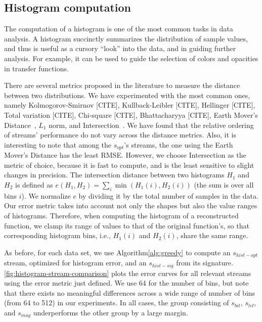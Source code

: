 \subsection{Histogram computation}\label{sec:histogram}


The computation of a histogram is one of the most common tasks in data analysis. A histogram
succinctly summarizes the distribution of sample values, and thus is useful as a cursory ``look''
into the data, and in guiding further analysis. For example, it can be used to guide the selection
of colors and opacities in transfer functions.

There are several metrics proposed in the literature to measure the distance between two
distributions. We have experimented with the most common ones, namely Kolmogorov-Smirnov [CITE],
Kullback-Leibler [CITE], Hellinger [CITE], Total variation [CITE], Chi-square [CITE], Bhattacharyya
[CITE], Earth Mover's Distance~\cite{emd1998}, $L_1$ norm, and
Intersection~\cite{histogram_intersection1991}. We have found that the relative ordering of streams'
performance do not vary across the distance metrics. Also, it is interesting to note that among the
$s_{opt}$'s streams, the one using the Earth Mover's Distance has the least RMSE. However, we choose
Intersection as the metric of choice, because it is fast to compute, and is the least sensitive to
slight changes in precision. The intersection distance between two histograms $H_1$ and $H_2$ is
defined as $e(H_1,H_2)=\sum_{i}{\min{(H_1(i),H_2(i))}}$ (the sum is over all bins $i$). We normalize
$e$ by dividing it by the total number of samples in the data. Our error metric takes into account
not only the shapes but also the value ranges of histograms. Therefore, when computing the histogram
of a reconstructed function, we clamp its range of values to that of the original function's, so
that corresponding histogram bins, i.e., $H_1(i)$ and $H_2(i)$, share the same range.

As before, for each data set, we use Algorithm\cref{alg:greedy} to compute an $s_{hist-opt}$
stream, optimized for histogram error, and an $s_{hist-sig}$ from its signature.
\cref{fig:histogram-stream-comparison} plots the error curves for all relevant streams using the
error metric just defined. We use 64 for the number of bins, but note that there exists no
meaningful differences across a wide range of number of bins (from 64 to 512) in our experiments. In
all cases, the group consisting of $s_{bit}$, $s_{lvl}$, and $s_{mag}$ underperforms the other group
by a large margin.

